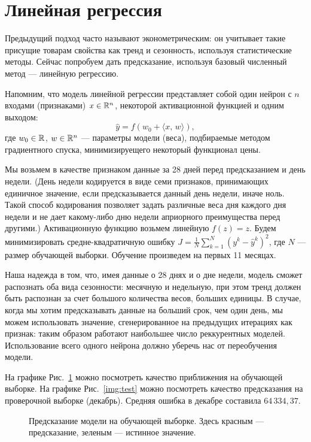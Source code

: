 \section{Линейная регрессия}

Предыдущий подход часто называют эконометрическим: он учитывает такие присущие товарам свойства как тренд и сезонность, используя статистические методы. Сейчас попробуем дать предсказание, используя базовый численный метод --- линейную регрессию.

Напомним, что модель линейной регрессии представляет собой один нейрон с $n$ входами (признаками) $x \in \mathbb{R}^n$, некоторой активационной функцией и одним выходом:
$$
\hat y = f(w_0 + \langle x,\,w\rangle),
$$
где $w_0 \in \mathbb{R}$, $w \in \mathbb{R}^n$ --- параметры модели (веса), подбираемые методом градиентного спуска, минимизируещего некоторый функционал цены.

Мы возьмем в качестве признаком данные за 28 дней перед предсказанием и день недели. (День недели кодируется в виде семи признаков, принимающих единичное значение, если предсказывается данный день недели, иначе ноль. Такой способ кодирования позволяет задать различные веса дня каждого дня недели и не дает какому-либо дню недели априорного преимущества перед другими.) Активационную функцию возьмем линейную $f(z) = z$. Будем минимизировать средне-квадратичную ошибку $J = \frac{1}{N}\sum_{k=1}^{N} (y^k - \hat y^k)^2$, где $N$ --- размер обучающей выборки.
Обучение произведем на первых 11 месяцах.

Наша надежда в том, что, имея данные о 28 днях и о дне недели, модель сможет распознать оба вида сезонности: месячную и недельную, при этом тренд должен быть распознан за счет большого количества весов, больших единицы. В случае, когда мы хотим предсказывать данные на больший срок, чем один день, мы можем использовать значение, сгенерированное на предыдущих итерациях как признак: таким образом работают наибольшее число реккурентных моделей. Использование всего одного нейрона должно уберечь нас от переобучения модели.

На графике Рис.~\ref{img:fit} можно посмотреть качество приближения на обучающей выборке. На графике Рис.~\ref{img:test} можно посмотреть качество предсказания на проверочной выборке (декабрь). Средняя ошибка в декабре составила $64\,334,\!37$.

\begin{figure}[h]
        \noindent{}
        \caption{Предсказание модели на обучающей выборке. Здесь красным --- предсказание, зеленым --- истинное значение.}
        \label{img:fit}
\end{figure}

